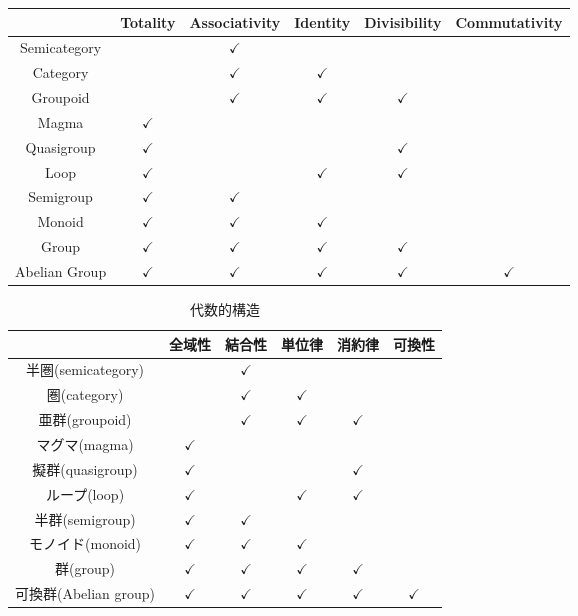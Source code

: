\documentclass[a4paper,draft]{jsbook}
\begin{document}
\begin{table*}
\begin{center}
\begin{tabular}{||c||c|c|c|c|c||}
\hline
&Totality&Associativity&Identity&Divisibility&Commutativity\\
\hline\hline
Semicategory&&$\checkmark$&&&\\
Category&&$\checkmark$&$\checkmark$&&\\
Groupoid&&$\checkmark$&$\checkmark$&$\checkmark$&\\
Magma&$\checkmark$&&&&\\
Quasigroup&$\checkmark$&&&$\checkmark$&\\
Loop&$\checkmark$&&$\checkmark$&$\checkmark$&\\
Semigroup&$\checkmark$&$\checkmark$&&&\\
Monoid&$\checkmark$&$\checkmark$&$\checkmark$&&\\
Group&$\checkmark$&$\checkmark$&$\checkmark$&$\checkmark$&\\
Abelian Group&$\checkmark$&$\checkmark$&$\checkmark$&$\checkmark$&$\checkmark$\\
\hline
\end{tabular}
\end{center}
\end{table*}

\begin{table*}
\caption{代数的構造}
\label{tab:algebraicstrcture}
\begin{center}
\begin{tabular}{||c||c|c|c|c|c||}
\hline
&全域性&結合性&単位律&消約律&可換性\\
\hline\hline
半圏(semicategory)&&$\checkmark$&&&\\
圏(category)&&$\checkmark$&$\checkmark$&&\\
亜群(groupoid)&&$\checkmark$&$\checkmark$&$\checkmark$&\\
マグマ(magma)&$\checkmark$&&&&\\
擬群(quasigroup)&$\checkmark$&&&$\checkmark$&\\
ループ(loop)&$\checkmark$&&$\checkmark$&$\checkmark$&\\
半群(semigroup)&$\checkmark$&$\checkmark$&&&\\
モノイド(monoid)&$\checkmark$&$\checkmark$&$\checkmark$&&\\
群(group)&$\checkmark$&$\checkmark$&$\checkmark$&$\checkmark$&\\
可換群(Abelian group)&$\checkmark$&$\checkmark$&$\checkmark$&$\checkmark$&$\checkmark$\\
\hline
\end{tabular}
\end{center}
\end{table*}
\end{document}
